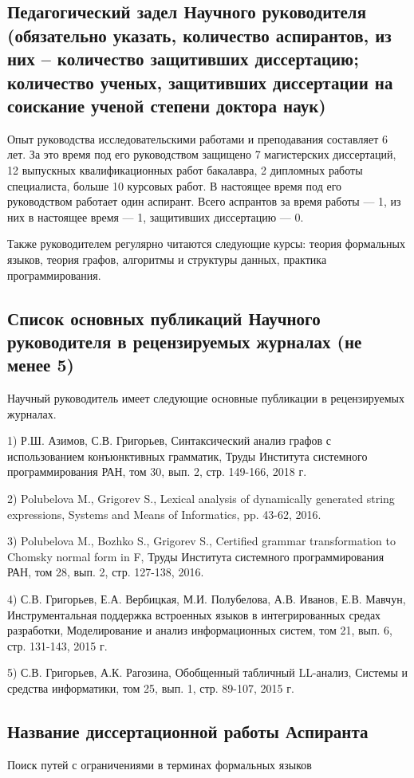 \documentclass[12pt]{article}  %
\theoremstyle{remark}
\begin{document}
\subsection{Педагогический задел Научного руководителя (обязательно указать, количество аспирантов, из них – количество защитивших диссертацию; количество ученых, защитивших диссертации на соискание ученой степени доктора наук)}
Опыт руководства исследовательскими работами и преподавания составляет 6 лет.
За это время под его руководством защищено 7 магистерских диссертаций, 12 выпускных квалификационных работ бакалавра, 2 дипломных работы специалиста, больше 10 курсовых работ. В настоящее время под его руководством работает один аспирант. Всего аспрантов за время работы --- 1, из них в настоящее время --- 1, защитивших диссертацию --- 0.

Также руководителем регулярно читаются следующие курсы: теория формальных языков, теория графов, алгоритмы и структуры данных, практика программирования.

\subsection{Список основных публикаций Научного руководителя в рецензируемых журналах (не менее 5)}
Научный руководитель имеет следующие основные публикации в рецензируемых журналах.

1) Р.Ш. Азимов, С.В. Григорьев, Синтаксический анализ графов с использованием конъюнктивных грамматик, Труды Института системного программирования РАН, том 30, вып. 2, стр. 149-166, 2018 г.

2) Polubelova M., Grigorev S., Lexical analysis of dynamically generated string expressions, Systems and Means of Informatics, pp. 43-62, 2016.

3) Polubelova M., Bozhko S., Grigorev S., Certified grammar transformation to Chomsky normal form in F, Труды Института системного программирования РАН, том 28, вып. 2, стр. 127-138, 2016.

4) С.В. Григорьев, Е.А. Вербицкая, М.И. Полубелова, А.В. Иванов, Е.В. Мавчун, Инструментальная поддержка встроенных языков в интегрированных средах разработки, Моделирование и анализ информационных систем, том 21, вып. 6, стр. 131-143, 2015 г.

5) С.В. Григорьев, А.К. Рагозина, Обобщенный табличный LL-анализ, Системы и средства информатики, том 25, вып. 1, стр. 89-107, 2015 г.
\subsection{Название диссертационной работы Аспиранта}
Поиск путей с ограничениями в терминах формальных языков
\end{document}
